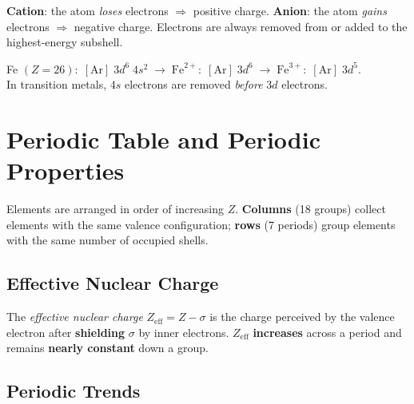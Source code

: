 \documentclass[a4paper,11pt]{article}
\begin{document}
\begin{definizione}
\textbf{Cation}: the atom \textit{loses} electrons $\Rightarrow$ positive charge. \textbf{Anion}: the atom \textit{gains} electrons $\Rightarrow$ negative charge. Electrons are always removed from or added to the highest-energy subshell.
\end{definizione}

\begin{esempio}
Fe $(Z{=}26):\;[\text{Ar}]\;3d^6\;4s^2 \;\to\; \text{Fe}^{2+}:\;[\text{Ar}]\;3d^6 \;\to\; \text{Fe}^{3+}:\;[\text{Ar}]\;3d^5$.\\
In transition metals, $4s$ electrons are removed \textit{before} $3d$ electrons.
\end{esempio}

\clearpage

\section{Periodic Table and Periodic Properties}

Elements are arranged in order of increasing $Z$. \textbf{Columns} (18 groups) collect elements with the same valence configuration; \textbf{rows} (7 periods) group elements with the same number of occupied shells.

\subsection{Effective Nuclear Charge}

\begin{definizione}
The \textit{effective nuclear charge} $Z_{\text{eff}} = Z - \sigma$ is the charge perceived by the valence electron after \textbf{shielding} $\sigma$ by inner electrons. $Z_{\text{eff}}$ \textbf{increases} across a period and remains \textbf{nearly constant} down a group.
\end{definizione}

\subsection{Periodic Trends}
\end{document}
